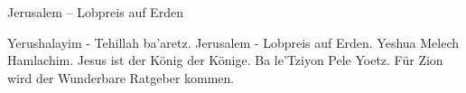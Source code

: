 Jerusalem – Lobpreis auf Erden

Yerushalayim - Tehillah ba'aretz. 	Jerusalem - Lobpreis auf Erden.
Yeshua Melech Hamlachim. 	        Jesus ist der König der Könige.
Ba le'Tziyon Pele Yoetz. 		Für Zion wird der Wunderbare Ratgeber kommen.